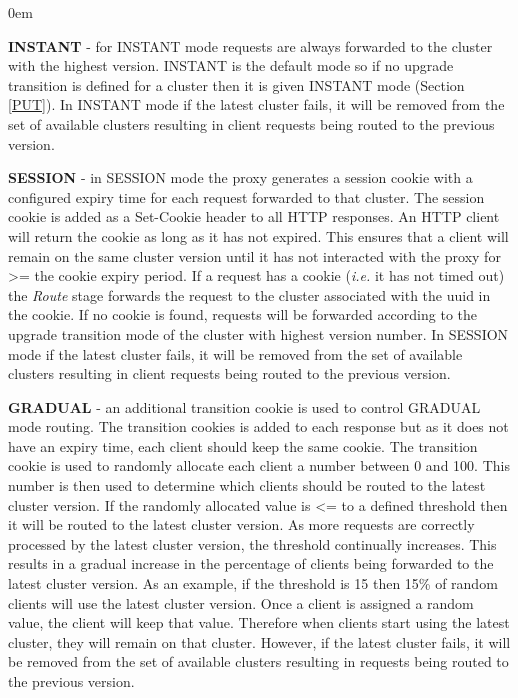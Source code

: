\documentclass[a4paper,11pt,twoside]{report}
\begin{document}
\begin{list}{-}{}
  \itemsep0em
  \item{\textbf{INSTANT}} - for INSTANT mode requests are always forwarded to the cluster with the highest version.  INSTANT is the default mode so if no upgrade transition is defined for a cluster then it is given INSTANT mode (Section \ref{PUT}).  In INSTANT mode if the latest cluster fails, it will be removed from the set of available clusters resulting in client requests being routed to the previous version.\medskip
  
  \item{\textbf{SESSION}} -  in SESSION mode the proxy generates a  session cookie with a configured expiry time for each request forwarded to that cluster. The session cookie is added as a Set-Cookie header to all HTTP responses. An HTTP client will return the cookie as long as it has not expired.  This ensures that a client will remain on the same cluster version until it has not interacted with the proxy for >= the cookie expiry period.  If a request has a cookie (\textit{i.e.} it has not timed out) the \textit{Route} stage forwards the request to the cluster associated with the uuid in the cookie.  If no cookie is found, requests will be forwarded according to the upgrade transition mode of the cluster with highest version number.  In SESSION mode if the latest cluster fails, it will be removed from the set of available clusters resulting in client requests being routed to the previous version.\medskip
  
   \item{\textbf{GRADUAL}} - an additional transition cookie is used to control GRADUAL mode routing.  The transition cookies is added to each response but as it does not have an expiry time, each client should keep the same cookie. The transition cookie is used to randomly allocate each client a number between 0 and 100. This number is then used to determine which clients should be routed to the latest cluster version.   If the randomly allocated value is <= to a defined threshold then it will be routed to the latest cluster version. As more requests are correctly processed by the latest cluster version, the threshold continually increases.  This results in a gradual increase in the percentage of clients being forwarded to the latest cluster version.  As an example, if the threshold is 15 then 15\% of random clients will use the latest cluster version.  Once a client is assigned a random value, the client will keep that value. Therefore when clients start using the latest cluster, they will remain on that cluster.  However, if the latest cluster fails, it will be removed from the set of available clusters resulting in requests being routed to the previous version. \medskip
   

\end{list}
\end{document}
